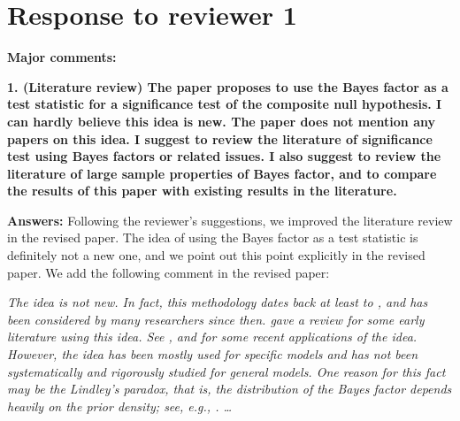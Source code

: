 \documentclass[11pt]{article}
\theoremstyle{plain}
\theoremstyle{definition}
\theoremstyle{remark}
\begin{document}
\section{Response to reviewer 1}

\textbf{Major comments:}

\textbf{1.
    (Literature review) The paper proposes to use the Bayes factor as a test statistic for a significance test of the composite null hypothesis. I can hardly believe this idea is new. The paper does not mention any papers on this idea. I suggest to review the literature of significance test using Bayes factors or related issues. I also suggest to review the literature of large sample properties of Bayes factor, and to compare the results of this paper with existing results in the literature.
}

\textbf{Answers:}
Following the reviewer's suggestions, we improved the literature review in the revised paper.
The idea of using the Bayes factor as a test statistic is definitely not a new one, and we point out this point explicitly in the revised paper.
We add the following comment in the revised paper:
\begin{adjustwidth}{1.5em}{1.5em}
    \emph{
The idea is not new.                                                                                      
In fact, this methodology dates back at least to \cite{Good1967}, and has been considered by many
researchers since then.
\cite{Good1992} gave a review for some early literature using this idea.                                  
See \cite{Aerts2004}, \cite{zhou2018On} and \cite{Wang2020} for some recent applications of the idea. 
However, the idea has been mostly used for specific models and has not been systematically and rigorously studied for general models.                                  
One reason for this fact may be the Lindley's paradox, that is, the distribution of the Bayes factor depends heavily on the prior density; see, e.g., \cite{Shafer1982}. \ldots
}
\end{adjustwidth}
\end{document}
